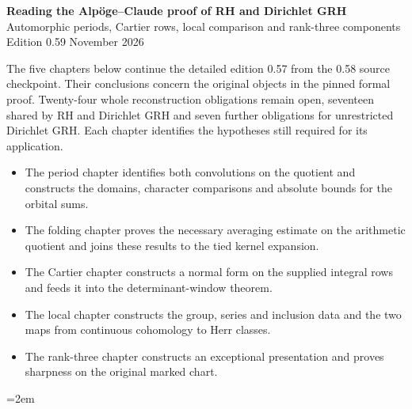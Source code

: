 \begin{center}
{\Large\bfseries Reading the Alp\"oge--Claude proof of RH and Dirichlet GRH}\\[5pt]
{\large Automorphic periods, Cartier rows, local comparison and rank-three components}\\[3pt]
Edition 0.59  November 2026
\end{center}
The five chapters below continue the detailed edition 0.57 from the
0.58 source checkpoint. Their conclusions concern the original objects
in the pinned formal proof. Twenty-four whole reconstruction obligations
remain open, seventeen shared by RH and Dirichlet GRH and seven further
obligations for unrestricted Dirichlet GRH. Each chapter identifies
the hypotheses still required for its application.
\begin{itemize}
\item The period chapter identifies both convolutions on the quotient
and constructs the domains, character comparisons and absolute bounds for the orbital sums.
\item The folding chapter proves the necessary averaging estimate on the arithmetic quotient and joins these results to the tied kernel expansion.
\item The Cartier chapter constructs a normal form on the supplied
integral rows and feeds it into the determinant-window theorem.
\item The local chapter constructs the group, series and inclusion
data and the two maps from continuous cohomology to Herr classes.
\item The rank-three chapter constructs an exceptional presentation
and proves sharpness on the original marked chart.
\end{itemize}
\begingroup\emergencystretch=2em




\endgroup
